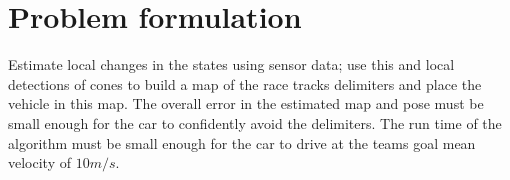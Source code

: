 \section{Problem formulation}
Estimate local changes in the states using sensor data; use this and local detections of cones to build a map of the race tracks delimiters and place the vehicle in this map. The overall error in the estimated map and pose must be small enough for the car to confidently avoid the delimiters. The run time of the algorithm must be small enough for the car to drive at the teams goal mean velocity of $10 m/s$.
